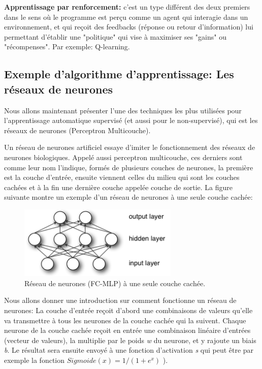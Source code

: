 \textbf{Apprentissage par renforcement:} c'est un type différent des deux premiers dans le sens où le programme est perçu comme un agent qui interagie dans un environnement, et qui reçoit des feedbacks (réponse ou retour d'information) lui permettant d’établir une "politique" qui vise à maximiser ses "gains" ou "récompenses". Par exemple: Q-learning.\\


\subsection{Exemple d'algorithme d'apprentissage: Les réseaux de neurones}
	
	Nous allons maintenant présenter l'une des techniques les plus utilisées pour l'apprentissage automatique supervisé (et aussi pour le non-supervisé), qui est les réseaux de neurones (Perceptron Multicouche).
	
	Un réseau de neurones artificiel essaye d'imiter le fonctionnement des réseaux de neurones biologiques. Appelé aussi perceptron multicouche, ces derniers sont comme leur nom l'indique, formés de plusieurs couches de neurones, la première est la couche d'entrée, ensuite viennent celles du milieu qui sont les couches cachées et à la fin une dernière couche appelée couche de sortie. La figure suivante montre un exemple d'un réseau de neurones à une seule couche cachée:


\begin{figure}[H]
	\centering
		\includegraphics[width=3in]{Figures/mlp.png}
	\caption[An Electron]{Réseau de neurones (FC-MLP) à une seule couche cachée.}
	\label{fig:Electron}
\end{figure}

	Nous allons donner une introduction sur comment fonctionne un réseau de neurones: La couche d'entrée reçoit d'abord une combinaisons de valeurs qu'elle va transmettre à tous les neurones de la couche cachée qui la suivent. Chaque neurone de la couche cachée reçoit en entrée une combinaison linéaire d'entrées (vecteur de valeurs), la multiplie par le poids \textit{w} du neurone, et y rajoute un biais \textit{b}. Le résultat sera ensuite envoyé à une fonction d'activation \textit{s} qui peut être par exemple la fonction $Sigmoide(x) = 1/(1+e^{x})$ ).
	

